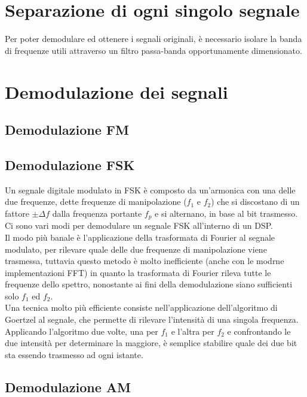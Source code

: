 \documentclass{article}
\begin{document}
\section{Separazione di ogni singolo segnale}
Per poter demodulare ed ottenere i segnali originali, è necessario isolare la banda di frequenze utili attraverso un filtro
passa-banda opportunamente dimensionato.

\section{Demodulazione dei segnali}

\subsection{Demodulazione FM}
\subsection{Demodulazione FSK}
Un segnale digitale modulato in FSK è composto da un'armonica con una delle due frequenze, dette frequenze di manipolazione
($f_1$ e $f_2$) che si discostano di un fattore $\pm \Delta f$ dalla frequenza portante $f_p$ e si alternano, in base al bit
trasmesso. Ci sono vari modi per demodulare un segnale FSK all'interno di un DSP.\\
Il modo più banale è l'applicazione della trasformata di Fourier al segnale modulato, per rilevare quale delle due frequenze
di manipolazione viene trasmessa, tuttavia questo metodo è molto inefficiente (anche con le modrne implementazioni FFT) in quanto
la trasformata di Fourier rileva tutte le frequenze dello spettro, nonostante ai fini della demodulazione siano sufficienti
solo $f_1$ ed $f_2$.\\
Una tecnica molto più efficiente consiste nell'applicazione dell'algoritmo di Goertzel al segnale, che permette di rilevare
l'intensità di una singola frequenza. Applicando l'algoritmo due volte, una per $f_1$ e l'altra per $f_2$ e confrontando le due
intensità per determinare la maggiore, è semplice stabilire quale dei due bit sta essendo trasmesso ad ogni istante.

\subsection{Demodulazione AM}
\end{document}
